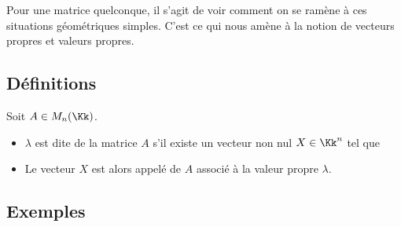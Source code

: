 \documentclass[11pt, class=report,crop=false]{standalone}
\begin{document}
Pour une matrice quelconque, il s'agit de voir comment on se ramène à ces situations géométriques simples. C'est ce qui nous amène à la notion de vecteurs propres et valeurs propres.


\subsection{Définitions}



\begin{definition}
Soit $A \in M_n(\Kk)$.

\begin{itemize}
  \item $\lambda$ est dite  de la matrice $A$ s'il
existe un vecteur non nul $X \in \Kk^n$ tel que 
  
  \item Le vecteur $X$ est alors appelé  de $A$ associé à la valeur propre $\lambda$.
\end{itemize}
\end{definition}

\subsection{Exemples}
 
\end{document}
